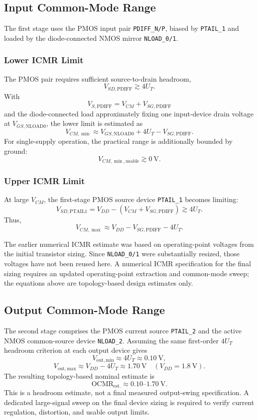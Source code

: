 \subsection{Input Common-Mode Range}

The first stage uses the PMOS input pair \texttt{PDIFF\_N/P}, biased by
\texttt{PTAIL\_1} and loaded by the diode-connected NMOS mirror
\texttt{NLOAD\_0/1}.

\subsubsection{Lower ICMR Limit}

The PMOS pair requires sufficient source-to-drain headroom,
\[
V_{SD,\mathrm{PDIFF}}\gtrsim4U_T.
\]
With
\[
V_{S,\mathrm{PDIFF}}=V_{CM}+V_{SG,\mathrm{PDIFF}}
\]
and the diode-connected load approximately fixing one input-device
drain voltage at $V_{GS,\mathrm{NLOAD0}}$, the lower limit is estimated as
\[
V_{CM,\min}\approx
V_{GS,\mathrm{NLOAD0}}+4U_T-V_{SG,\mathrm{PDIFF}}.
\]
For single-supply operation, the practical range is additionally
bounded by ground:
\[
V_{CM,\min,\mathrm{usable}}\gtrsim0~\mathrm{V}.
\]

\subsubsection{Upper ICMR Limit}

At large $V_{CM}$, the first-stage PMOS source device
\texttt{PTAIL\_1} becomes limiting:
\[
V_{SD,\mathrm{PTAIL1}}=
V_{DD}-\left(V_{CM}+V_{SG,\mathrm{PDIFF}}\right)
\gtrsim4U_T.
\]
Thus,
\[
\boxed{V_{CM,\max}\approx
V_{DD}-V_{SG,\mathrm{PDIFF}}-4U_T}.
\]

The earlier numerical ICMR estimate was based on operating-point
voltages from the initial transistor sizing. Since \texttt{NLOAD\_0/1}
were substantially resized, those voltages have not been reused here.
A numerical ICMR specification for the final sizing requires an updated
operating-point extraction and common-mode sweep; the equations above
are topology-based design estimates only.

\subsection{Output Common-Mode Range}

The second stage comprises the PMOS current source \texttt{PTAIL\_2}
and the active NMOS common-source device \texttt{NLOAD\_2}.
Assuming the same first-order $4U_T$ headroom criterion at each output
device gives
\[
V_{\mathrm{out,min}}\approx4U_T\approx0.10~\mathrm{V},
\]
\[
V_{\mathrm{out,max}}\approx V_{DD}-4U_T
\approx1.70~\mathrm{V}
\quad(V_{DD}=1.8~\mathrm{V}).
\]
The resulting topology-based nominal estimate is
\[
\boxed{\mathrm{OCMR}_{\mathrm{est.}}\approx
0.10\text{--}1.70~\mathrm{V}}.
\]
This is a headroom estimate, not a final measured output-swing
specification. A dedicated large-signal sweep on the final device
sizing is required to verify current regulation, distortion, and
usable output limits.

